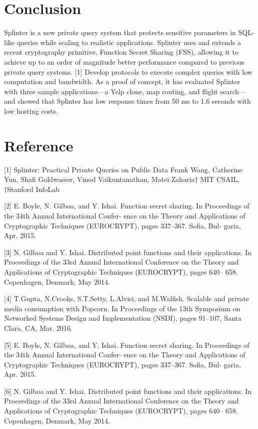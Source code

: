 \documentclass[12pt,a4paper]{article}
\begin{document}
\begin{multicols}{2}
\section{Conclusion}
Splinter is a new private query system that protects sensitive parameters in SQL-like queries while scaling to realistic applications. Splinter uses and extends a recent cryptography primitive, Function Secret Sharing (FSS), allowing it to achieve up to an order of magnitude better performance compared to previous private query systems. [1] Develop protocols to execute complex queries with low computation and bandwidth. As a proof of concept, it has evaluated Splinter with three sample applications—a Yelp clone, map routing, and flight search—and showed that Splinter has low response times from 50 ms to 1.6 seconds with low hosting costs.

\section{Reference}
[1] Splinter: Practical Private Queries on Public 
Data Frank Wang, Catherine Yun, Shafi Goldwasser, 
Vinod Vaikuntanathan, Matei Zaharia† MIT CSAIL, 
†Stanford InfoLab

[2] E. Boyle, N. Gilboa, and Y. Ishai. Function 
secret sharing. In Proceedings of the 34th Annual 
International Confer- ence on the Theory and 
Applications of Cryptographic Techniques 
(EUROCRYPT), pages 337–367. Sofia, Bul- garia, Apr. 
2015.

[3] N. Gilboa and Y. Ishai. Distributed point 
functions and their applications. In Proceedings of 
the 33rd Annual International Conference on the 
Theory and Applications of Cryptographic Techniques 
(EUROCRYPT), pages 640– 658. Copenhagen, Denmark, 
May 2014.

[4] T.Gupta, N.Crooks, S.T.Setty, L.Alvisi, and  M.Walfish. Scalable and private media consumption with Popcorn. In Proceedings of the 13th Symposium on Networked Systems Design and Implementation (NSDI), pages 91–107, Santa Clara, CA, Mar. 2016.

[5] E. Boyle, N. Gilboa, and Y. Ishai. Function secret sharing. In Proceedings of the 34th Annual International Confer- ence on the Theory and Applications of Cryptographic Techniques (EUROCRYPT), pages 337–367. Sofia, Bul- garia, Apr. 2015.

[6] N. Gilboa and Y. Ishai. Distributed point functions and their applications. In Proceedings of the 33rd Annual International Conference on the Theory and Applications of Cryptographic Techniques (EUROCRYPT), pages 640– 658. Copenhagen, Denmark, May 2014.


\end{multicols}
\end{document}
